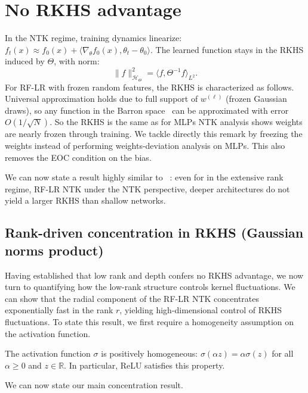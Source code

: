 \section{No RKHS advantage}\label{sec:no-rkhs-advantage}
In the NTK regime, training dynamics linearize: \( f_t(x) \approx f_0(x) + \langle \nabla_\theta f_0(x), \theta_t - \theta_0 \rangle \). The learned function stays in the RKHS induced by \( \Theta \), with norm:
\[
\|f\|_{\mathcal{H}_\Theta}^2 = \langle f, \Theta^{-1} f \rangle_{L^2}.
\]
For RF-LR with frozen random features, the RKHS is characterized as follows. Universal approximation holds due to full support of \( w^{(\ell)} \) (frozen Gaussian draws), so any function in the Barron space~\cite{e2021barronspaceflowinducedfunction} can be approximated with error \( O(1/\sqrt{N}) \). 
So the RKHS is the same as for MLPs NTK analysis shows weights are nearly frozen through training. We tackle directly this remark by freezing the weights instead of performing weights-deviation analysis on MLPs.
This also removes the EOC condition on the bias.

We can now state a result highly similar to ~\cite{bietti2021deepequalsshallowrelu}: even for in the extensive rank regime, RF-LR NTK under the NTK perspective, deeper architectures do not yield a larger RKHS than shallow networks.

\vspace{0.5em}
\subsection{Rank-driven concentration in RKHS (Gaussian norms product)}\label{subsec:rank-driven-concentration}
Having established that low rank and depth confers no RKHS advantage, we now turn to quantifying how the low-rank structure controls kernel fluctuations. We can show that the radial component of the RF-LR NTK concentrates exponentially fast in the rank \( r \), yielding high-dimensional control of RKHS fluctuations. To state this result, we first require a homogeneity assumption on the activation function.

\begin{assumption}
The activation function \( \sigma \) is positively homogeneous: \( \sigma(\alpha z) = \alpha \sigma(z) \) for all \( \alpha \ge 0 \) and \( z \in \mathbb{R} \). In particular, ReLU satisfies this property.
\end{assumption}

We can now state our main concentration result.


